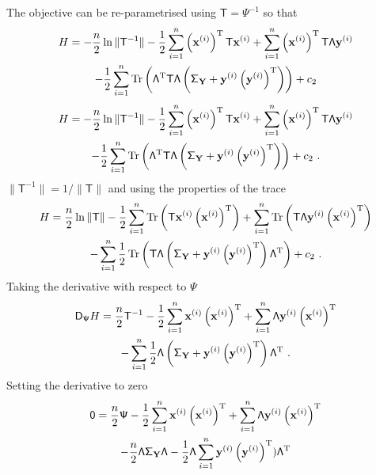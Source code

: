 \documentclass[12pt]{report}
\DeclareMathOperator{\trace}{Tr}
\newcommand{\T}{^\textup{T}}
\newcommand{\vect}[1]{\mathbf{#1}}
\newcommand{\matr}[1]{\mathsf{#1}}
\begin{document}
The objective can be re-parametrised using $\matr{T}=\matr{\Psi}^{-1}$ so that
\begin{multline*}
H = -\frac{n}{2}
\ln\|\matr{T^{-1}}\|
-\frac{1}{2}\sum_{i=1}^{n}\left(\vect{x}^{(i)}\right)\T\matr{T}\vect{x}^{(i)}
+\sum_{i=1}^{n}\left(\vect{x}^{(i)}\right)\T\matr{T}\matr{\Lambda}\vect{y}^{(i)}\\
-\frac{1}{2}\sum_{i=1}^{n}\trace\left(\matr{\Lambda}\T\matr{T}\matr{\Lambda}\left(\matr{\Sigma}_{\vect{Y}}+\vect{y}^{(i)}\left(\vect{y}^{(i)}\right)\T\right)\right)
+c_2
\end{multline*}
\begin{multline*}
H = -\frac{n}{2}
\ln\|\matr{T^{-1}}\|
-\frac{1}{2}\sum_{i=1}^{n}\left(\vect{x}^{(i)}\right)\T\matr{T}\vect{x}^{(i)}
+\sum_{i=1}^{n}\left(\vect{x}^{(i)}\right)\T\matr{T}\matr{\Lambda}\vect{y}^{(i)}\\
-\frac{1}{2}\sum_{i=1}^{n}\trace\left(\matr{\Lambda}\T\matr{T}\matr{\Lambda}\left(\matr{\Sigma}_{\vect{Y}}+\vect{y}^{(i)}\left(\vect{y}^{(i)}\right)\T\right)\right)
+c_2 \ .
\end{multline*}
$\|\matr{T}^{-1}\| = 1/\|\matr{T}\|$ and using the properties of the trace
\begin{multline*}
H = \frac{n}{2}
\ln\|\matr{T}\|
-\frac{1}{2}\sum_{i=1}^{n}\trace\left(\matr{T}\vect{x}^{(i)}\left(\vect{x}^{(i)}\right)\T\right)
+\sum_{i=1}^{n}\trace\left(\matr{T}\matr{\Lambda}\vect{y}^{(i)}\left(\vect{x}^{(i)}\right)\T\right)\\
-\sum_{i=1}^{n}\frac{1}{2}\trace\left(\matr{T}\matr{\Lambda}\left(\matr{\Sigma}_{\vect{Y}}+\vect{y}^{(i)}\left(\vect{y}^{(i)}\right)\T\right)\matr{\Lambda}\T\right)
+c_2 \ .
\end{multline*}
Taking the derivative with respect to $\matr{\Psi}$
\begin{multline*}
\matr{D}_{\matr{\Psi}}H = \frac{n}{2}\matr{T}^{-1}
-\frac{1}{2}\sum_{i=1}^{n}\vect{x}^{(i)}\left(\vect{x}^{(i)}\right)\T
+\sum_{i=1}^{n}\matr{\Lambda}\vect{y}^{(i)}\left(\vect{x}^{(i)}\right)\T\\
-\sum_{i=1}^{n}\frac{1}{2}\matr{\Lambda}\left(\matr{\Sigma}_{\vect{Y}}+\vect{y}^{(i)}\left(\vect{y}^{(i)}\right)\T\right)\matr{\Lambda}\T \ .
\end{multline*}
Setting the derivative to zero
\begin{multline*}
\matr{0} = \frac{n}{2}\matr{\Psi}
-\frac{1}{2}\sum_{i=1}^{n}\vect{x}^{(i)}\left(\vect{x}^{(i)}\right)\T
+\sum_{i=1}^{n}\matr{\Lambda}\vect{y}^{(i)}\left(\vect{x}^{(i)}\right)\T\\
-\frac{n}{2}\matr{\Lambda}\matr{\Sigma}_{\vect{Y}}\matr{\Lambda}-\frac{1}{2}\matr{\Lambda}\sum_{i=1}^{n}\vect{y}^{(i)}\left(\vect{y}^{(i)}\right)\T)\matr{\Lambda}\T
\end{multline*}
\end{document}
